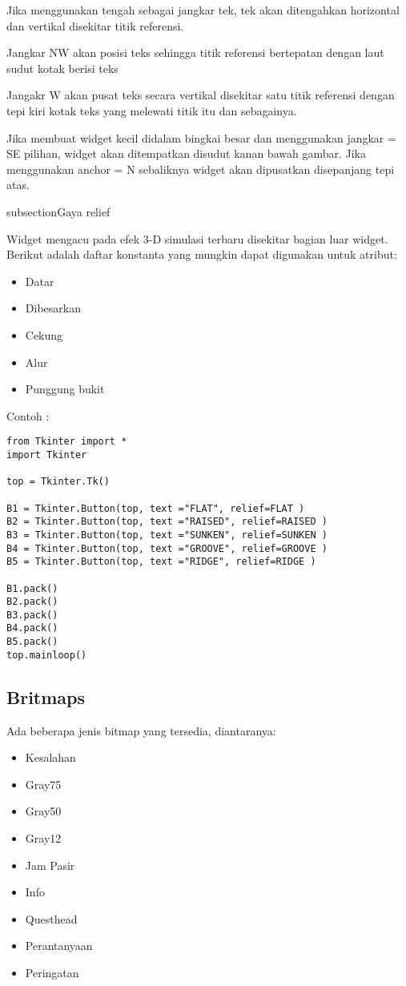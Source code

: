  \par
\vspace{12pt}
Jika menggunakan tengah sebagai jangkar tek, tek akan ditengahkan horizontal dan vertikal disekitar titik referensi. \par
Jangkar NW akan posisi teks sehingga titik referensi bertepatan dengan laut sudut kotak berisi teks \par
Jangakr W akan pusat teks secara vertikal disekitar satu titik referensi dengan tepi kiri kotak teks yang melewati titik itu dan sebagainya. \par
Jika membuat widget kecil didalam bingkai besar dan menggunakan jangkar = SE pilihan, widget akan ditempatkan disudut kanan bawah gambar. Jika menggunakan anchor = N sebaliknya widget akan dipusatkan disepanjang tepi atas. \par
\noindent 

subsection{Gaya relief}

Widget mengacu pada efek 3-D simulasi terbaru disekitar bagian luar widget. Berikut adalah daftar konstanta yang mungkin dapat digunakan untuk atribut:
\begin{itemize}
	\item Datar
	\item Dibesarkan
	\item Cekung
	\item Alur
	\item Punggung bukit
\end{itemize}


\vspace{12pt}
Contoh : \par
\begin{verbatim}
from Tkinter import *
import Tkinter

top = Tkinter.Tk()

B1 = Tkinter.Button(top, text ="FLAT", relief=FLAT )
B2 = Tkinter.Button(top, text ="RAISED", relief=RAISED )
B3 = Tkinter.Button(top, text ="SUNKEN", relief=SUNKEN )
B4 = Tkinter.Button(top, text ="GROOVE", relief=GROOVE )
B5 = Tkinter.Button(top, text ="RIDGE", relief=RIDGE )

B1.pack()
B2.pack()
B3.pack()
B4.pack()
B5.pack()
top.mainloop()
\end{verbatim}

\noindent 
\subsection{Britmaps}
\noindent 
Ada beberapa jenis bitmap yang tersedia, diantaranya: \par
\noindent 
\begin{itemize}
	\item Kesalahan
	\item Gray75 
	\item Gray50 
	\item Gray12
	\item Jam Pasir 
	\item Info 
	\item Questhead
	\item Perantanyaan
	\item Peringatan
\end{itemize}

